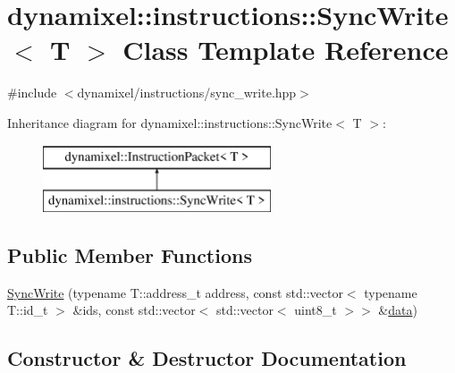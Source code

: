 \hypertarget{classdynamixel_1_1instructions_1_1_sync_write}{}\section{dynamixel\+:\+:instructions\+:\+:Sync\+Write$<$ T $>$ Class Template Reference}
\label{classdynamixel_1_1instructions_1_1_sync_write}


{\ttfamily \#include $<$dynamixel/instructions/sync\+\_\+write.\+hpp$>$}

Inheritance diagram for dynamixel\+:\+:instructions\+:\+:Sync\+Write$<$ T $>$\+:\begin{figure}[H]
\begin{center}
\leavevmode
\includegraphics[height=2.000000cm]{classdynamixel_1_1instructions_1_1_sync_write}
\end{center}
\end{figure}
\subsection*{Public Member Functions}
\begin{DoxyCompactItemize}
\item 
\hyperlink{classdynamixel_1_1instructions_1_1_sync_write_abdc2dccf51359a99809088bc128da91b}{Sync\+Write} (typename T\+::address\+\_\+t address, const std\+::vector$<$ typename T\+::id\+\_\+t $>$ \&ids, const std\+::vector$<$ std\+::vector$<$ uint8\+\_\+t $>$$>$ \&\hyperlink{classdynamixel_1_1_instruction_packet_a9a642ac2e80dc38172166b0508101bb8}{data})
\end{DoxyCompactItemize}


\subsection{Constructor \& Destructor Documentation}
